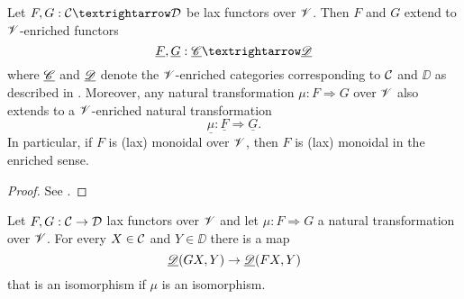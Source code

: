 \documentclass[Thesis.tex]{subfiles}
\begin{document}
\begin{propo}\label{enrichedtrans}
Let $F,G : \CC → \DD$ be lax functors over $\mathscr{V}$. Then $F$ and $G$ extend to $\mathscr{V}$-enriched
functors
\[\underline{F},\underline{G} : \uC → \uD\]
where $\underline{\mathscr{C}}$ and $\underline{\mathscr{D}}$ denote the $\mathscr{V}$-enriched categories corresponding to ${\mathcal C}$ and $\DD$ as described in . Moreover, any natural transformation $μ : F ⇒ G$ over $\mathscr{V}$ also extends to a $\mathscr{V}$-enriched natural
transformation
\[\underline{μ} : \underline{F} ⇒ \underline{G}.\]
In particular, if $F$ is (lax) monoidal over $\mathscr{V}$, then $F$ is (lax) monoidal in the enriched sense.
\end{propo}
\begin{proof}
See \cite[Proposition 4.11]{whitehouse}.
\end{proof}
\begin{lem}
Let $F,G:{\mathcal C}\to{\mathcal D}$ lax functors over $\mathscr{V}$ and let $\mu : F\Rightarrow G$ a natural transformation over $\mathscr{V}$. For every $X\in{\mathcal C}$ and $Y\in\DD$ there is a map \[\underline{\mathscr{D}}(GX,Y)\to\underline{\mathscr{D}}(FX,Y)\] that is an isomorphism if $\mu$ is an isomorphism.
\end{lem}
\end{document}
